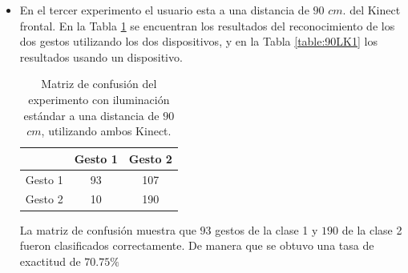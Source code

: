 \begin{itemize}
La matriz de confusión muestra que $88$ gestos de la clase 1 y $183$ de la clase 2 fueron clasificados correctamente. De manera que se obtuvo una tasa de exactitud de $70.5\%$ 

En este experimento la exactitud del reconocimiento es baja para el uso de ambos o un dispositivo Kinect. Se observa que clasifica los gestos de la clase uno como de la clase dos, esto es debido a la calidad de la imágenes debido a que el sensor no siempre proporciona información detallada o completa de la mano.  



\item En el tercer experimento el usuario esta a una distancia de $90$ $cm.$ del Kinect frontal. En la Tabla \ref{table:90LK2} se encuentran los resultados del reconocimiento de los dos gestos utilizando los dos dispositivos, y en la Tabla \ref{table:90LK1} los resultados usando un dispositivo.   
 

\begin{table}[h!] 
\begin{center}
\begin{tabular}{ r || c | c |} 
        & Gesto 1 & Gesto 2 \\ \hline \hline  
Gesto 1 &  93    & 107      \\ \hline  
Gesto 2 &  10    & 190     \\   
\end{tabular}
\end{center} 
\caption{Matriz de confusión del experimento con iluminación estándar a una distancia de $90$ $cm$, utilizando ambos Kinect.}
\label{table:90LK2}
\end{table} 

La matriz de confusión muestra que $93$ gestos de la clase 1 y $190$ de la clase 2 fueron clasificados correctamente. De manera que se obtuvo una tasa de exactitud de $70.75\%$ 


\end{itemize}
